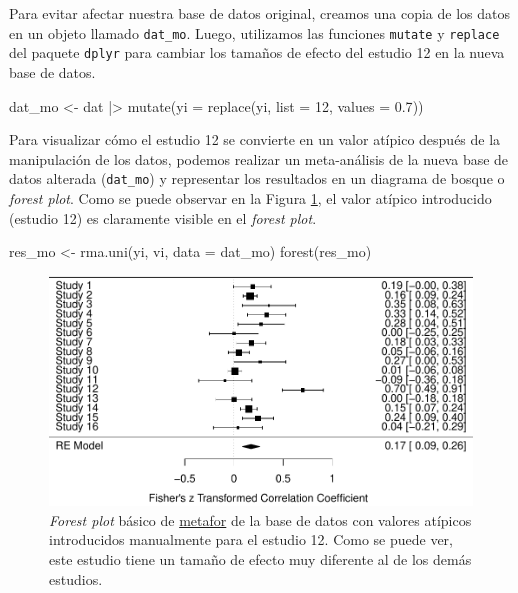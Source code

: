 \documentclass[
  bookmarksnumbered]{article}
\newenvironment{Shaded}{\begin{snugshade}}{\end{snugshade}}
\newcommand{\AttributeTok}[1]{\textcolor[rgb]{0.00,0.34,0.68}{#1}}
\newcommand{\DecValTok}[1]{\textcolor[rgb]{0.69,0.50,0.00}{#1}}
\newcommand{\FloatTok}[1]{\textcolor[rgb]{0.69,0.50,0.00}{#1}}
\newcommand{\FunctionTok}[1]{\textcolor[rgb]{0.39,0.29,0.61}{#1}}
\newcommand{\NormalTok}[1]{\textcolor[rgb]{0.12,0.11,0.11}{#1}}
\newcommand{\OtherTok}[1]{\textcolor[rgb]{0.00,0.43,0.16}{#1}}
\newcommand{\SpecialCharTok}[1]{\textcolor[rgb]{0.24,0.68,0.91}{#1}}
\begin{document}
Para evitar afectar nuestra base de datos original, creamos una copia de los datos en un objeto llamado \texttt{dat\_mo}. Luego, utilizamos las funciones \texttt{mutate} y \texttt{replace} del paquete \texttt{dplyr} \autocite{WickhamDplyr2021} para cambiar los tamaños de efecto del estudio 12 en la nueva base de datos.

\begin{Shaded}
\begin{Highlighting}[]
\NormalTok{dat\_mo }\OtherTok{\textless{}{-}}\NormalTok{ dat }\SpecialCharTok{|\textgreater{}}
  \FunctionTok{mutate}\NormalTok{(}\AttributeTok{yi =} \FunctionTok{replace}\NormalTok{(yi, }\AttributeTok{list =} \DecValTok{12}\NormalTok{, }\AttributeTok{values =} \FloatTok{0.7}\NormalTok{))}
\end{Highlighting}
\end{Shaded}

Para visualizar cómo el estudio 12 se convierte en un valor atípico después de la manipulación de los datos, podemos realizar un meta-análisis de la nueva base de datos alterada (\texttt{dat\_mo}) y representar los resultados en un diagrama de bosque o \emph{forest plot}. Como se puede observar en la Figura \ref{fig:for-plot-mo}, el valor atípico introducido (estudio 12) es claramente visible en el \emph{forest plot}.

\begin{Shaded}
\begin{Highlighting}[]
\NormalTok{res\_mo }\OtherTok{\textless{}{-}} \FunctionTok{rma.uni}\NormalTok{(yi, vi, }\AttributeTok{data =}\NormalTok{ dat\_mo) }
\FunctionTok{forest}\NormalTok{(res\_mo)}
\end{Highlighting}
\end{Shaded}

\begin{figure}
\centering
\includegraphics{Meta-analysis_files/figure-latex/for-plot-mo-1.pdf}
\caption{\label{fig:for-plot-mo}\emph{Forest plot} básico de \href{https://www.metafor-project.org/doku.php}{metafor} de la base de datos con valores atípicos introducidos manualmente para el estudio 12. Como se puede ver, este estudio tiene un tamaño de efecto muy diferente al de los demás estudios.}
\end{figure}
\end{document}

